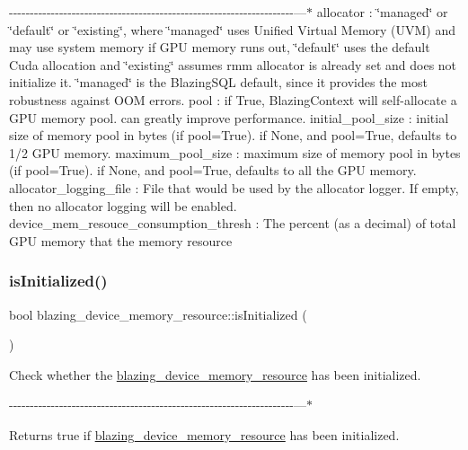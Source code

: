 -\/-\/-\/-\/-\/-\/-\/-\/-\/-\/-\/-\/-\/-\/-\/-\/-\/-\/-\/-\/-\/-\/-\/-\/-\/-\/-\/-\/-\/-\/-\/-\/-\/-\/-\/-\/-\/-\/-\/-\/-\/-\/-\/-\/-\/-\/-\/-\/-\/-\/-\/-\/-\/-\/-\/-\/-\/-\/-\/-\/-\/-\/-\/-\/-\/-\/-\/-\/---$\ast$ allocator \+: \char`\"{}managed\char`\"{} or \char`\"{}default\char`\"{} or \char`\"{}existing\char`\"{}, where \char`\"{}managed\char`\"{} uses Unified Virtual Memory (U\+VM) and may use system memory if G\+PU memory runs out, \char`\"{}default\char`\"{} uses the default Cuda allocation and \char`\"{}existing\char`\"{} assumes rmm allocator is already set and does not initialize it. \char`\"{}managed\char`\"{} is the Blazing\+S\+QL default, since it provides the most robustness against O\+OM errors. pool \+: if True, Blazing\+Context will self-\/allocate a G\+PU memory pool. can greatly improve performance. initial\+\_\+pool\+\_\+size \+: initial size of memory pool in bytes (if pool=True). if None, and pool=True, defaults to 1/2 G\+PU memory. maximum\+\_\+pool\+\_\+size \+: maximum size of memory pool in bytes (if pool=True). if None, and pool=True, defaults to all the G\+PU memory. allocator\+\_\+logging\+\_\+file \+: File that would be used by the allocator logger. If empty, then no allocator logging will be enabled. device\+\_\+mem\+\_\+resouce\+\_\+consumption\+\_\+thresh \+: The percent (as a decimal) of total G\+PU memory that the memory resource\mbox{\label{classblazing__device__memory__resource_a01ae4b27062b3e30a22771edb4c625ac}} 
\subsubsection{\texorpdfstring{is\+Initialized()}{isInitialized()}}
{\footnotesize\ttfamily bool blazing\+\_\+device\+\_\+memory\+\_\+resource\+::is\+Initialized (\begin{DoxyParamCaption}{ }\end{DoxyParamCaption})}



Check whether the \hyperlink{classblazing__device__memory__resource}{blazing\+\_\+device\+\_\+memory\+\_\+resource} has been initialized. 

-\/-\/-\/-\/-\/-\/-\/-\/-\/-\/-\/-\/-\/-\/-\/-\/-\/-\/-\/-\/-\/-\/-\/-\/-\/-\/-\/-\/-\/-\/-\/-\/-\/-\/-\/-\/-\/-\/-\/-\/-\/-\/-\/-\/-\/-\/-\/-\/-\/-\/-\/-\/-\/-\/-\/-\/-\/-\/-\/-\/-\/-\/-\/-\/-\/-\/-\/-\/---$\ast$ \begin{DoxyReturn}{Returns}
true if \hyperlink{classblazing__device__memory__resource}{blazing\+\_\+device\+\_\+memory\+\_\+resource} has been initialized. 
\end{DoxyReturn}



